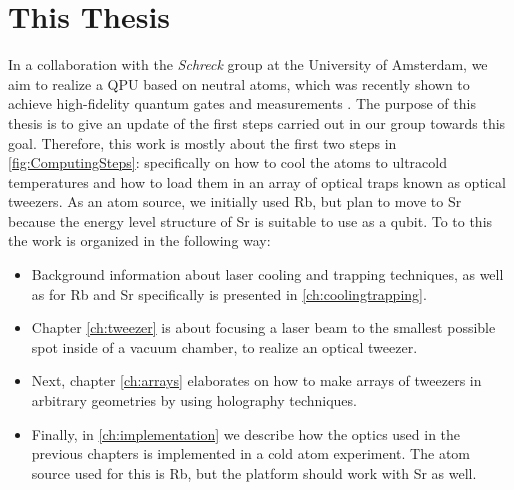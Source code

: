 \section{This Thesis}

In a collaboration with the \textit{Schreck} group at the University of Amsterdam, we aim to realize a \ac{QPU} based on neutral atoms, which was recently shown to achieve high-fidelity quantum gates and measurements \cite{Madjarov2020}. 
The purpose of this thesis is to give an update of the first steps carried out in our group towards this goal.
Therefore, this work is mostly about the first two steps in \cref{fig:ComputingSteps}: specifically on how to cool the atoms to ultracold temperatures and how to load them in an array of optical traps known as optical tweezers.
As an atom source, we initially used \ac{Rb}, but plan to move to \ac{Sr} because the energy level structure of Sr is suitable to use as a qubit. 
To to this the work is organized in the following way:

\begin{itemize}
	\setlength\itemsep{-1pt}
	\item Background information about laser cooling and trapping techniques, as well as for Rb and Sr specifically is presented in \cref{ch:coolingtrapping}. 

	\item Chapter \ref{ch:tweezer} is about focusing a laser beam to the smallest possible spot inside of a vacuum chamber, to realize an optical tweezer.

	\item Next, chapter \ref{ch:arrays} elaborates on how to make arrays of tweezers in arbitrary geometries by using holography techniques.

	\item Finally, in \cref{ch:implementation} we describe how the optics used in the previous chapters is implemented in a cold atom experiment. 
	The atom source used for this is Rb, but the platform should work with Sr as well. 
\end{itemize}










